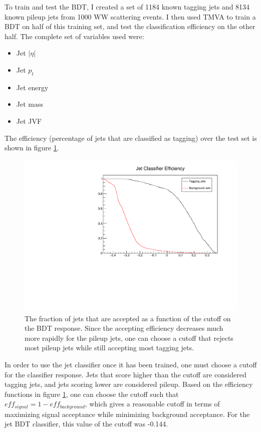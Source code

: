 \documentclass[10pt]{ucscthesisbs}
\begin{document}
To train and test the BDT, I created a set of 1184 known tagging jets and 8134 known pileup jets from 1000 WW scattering events. I then used TMVA to train a BDT on half of this training set, and test the classification efficiency on the other half. The complete set of variables used were:
\begin{itemize}
\item Jet $|\eta|$
\item Jet $p_t$
\item Jet energy
\item Jet mass
\item Jet JVF
\end{itemize}
The efficiency (percentage of jets that are classified as tagging) over the test set is shown in figure \ref{fig:jetbdteff}.
\begin{figure}
\includegraphics[height=8cm]{images/JetClassifierEff}
\caption{The fraction of jets that are accepted as a function of the cutoff on the BDT response. Since the accepting efficiency decreases much more rapidly for the pileup jets, one can choose a cutoff that rejects most pileup jets while still accepting most tagging jets.}
\label{fig:jetbdteff}
\end{figure}
In order to use the jet classifier once it has been trained, one must choose a cutoff for the classifier response. Jets that score higher than the cutoff are considered tagging jets, and jets scoring lower are considered pileup. Based on the efficiency functions in figure \ref{fig:jetbdteff}, one can choose the cutoff such that $eff_{signal} = 1 - eff_{background}$, which gives a reasonable cutoff in terms of maximizing signal acceptance while minimizing background acceptance. For the jet BDT classifier, this value of the cutoff was -0.144. 
\end{document}

